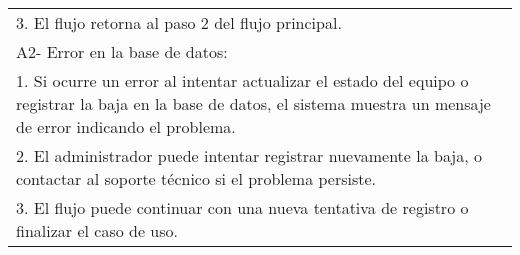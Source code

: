 \documentclass[stu, 12pt, letterpaper, donotrepeattitle, floatsintext, natbib]{apa7}
\begin{document}
\begin{longtable}{@{} p{16.5cm} @{}}
    \hspace{1cm}3. El flujo retorna al paso 2 del flujo principal.                                                                                                                                                                      \\
    A2- Error en la base de datos:                                                                                                                                                                                                      \\
    \hspace{1cm}1. Si ocurre un error al intentar actualizar el estado del equipo o registrar la baja en la base de datos, el sistema muestra un mensaje de error indicando el problema.                                                \\
    \hspace{1cm}2. El administrador puede intentar registrar nuevamente la baja, o contactar al soporte t\'ecnico si el problema persiste.                                                                                              \\
    \hspace{1cm}3. El flujo puede continuar con una nueva tentativa de registro o finalizar el caso de uso.                                                                                                                             \\ \bottomrule
\end{longtable}
\newpage
\end{document}

